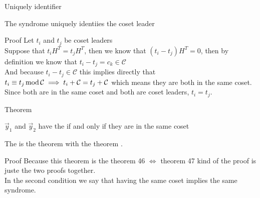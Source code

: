 \begin{parag}{Uniquely identifier}
    \begin{theoreme}
    The syndrome uniquely identiies the coset leader
    \end{theoreme}
    \begin{subparag}{Proof}
        Let $t_i$ and $t_j$ be coset leaders\\
	Suppose that $t_iH^T = t_j H^T$, then we know that $\left(t_i - t_j\right)H^T = 0$, then by definition we know that $t_i - t_j = c_k \in \mathcal{C}$\\
	And because $t_i - t_j \in \mathcal{C}$ this implies directly that $t_i \equiv t_j \operatorname{mod} \mathcal{C} \implies t_i + \mathcal{C} = t_j + \mathcal{C}$ which means they are both in the same coset. Since both are in the same coset and both are coset leaders, $t_i = t_j$.
    \end{subparag}
\end{parag}



\begin{parag}{Theorem}
    \begin{theoreme}
    $\vec{y}_1$ and $\vec{y}_2$ have the  if and only if they are in the same coset  
    \end{theoreme}
    The is the theorem  with the theorem .
    \begin{subparag}{Proof}
        Because this theorem is the theorem 46 $\iff$ theorem 47 kind of the proof is juste the two proofs together. \\
        In the second condition we say that having the same coset implies the same syndrome.
    \end{subparag}
\end{parag}





